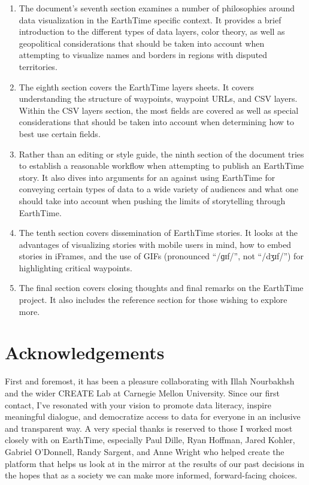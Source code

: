 \documentclass[
]{book}
\begin{document}
\begin{enumerate}
\item
  The document's seventh section examines a number of philosophies around data visualization in the EarthTime specific context. It provides a brief introduction to the different types of data layers, color theory, as well as geopolitical considerations that should be taken into account when attempting to visualize names and borders in regions with disputed territories.
\item
  The eighth section covers the EarthTime layers sheets. It covers understanding the structure of waypoints, waypoint URLs, and CSV layers. Within the CSV layers section, the most fields are covered as well as special considerations that should be taken into account when determining how to best use certain fields.
\item
  Rather than an editing or style guide, the ninth section of the document tries to establish a reasonable workflow when attempting to publish an EarthTime story. It also dives into arguments for an against using EarthTime for conveying certain types of data to a wide variety of audiences and what one should take into account when pushing the limits of storytelling through EarthTime.
\item
  The tenth section covers dissemination of EarthTime stories. It looks at the advantages of visualizing stories with mobile users in mind, how to embed stories in iFrames, and the use of GIFs (pronounced ``/ɡɪf/'', not ``/dʒɪf/'') for highlighting critical waypoints.
\item
  The final section covers closing thoughts and final remarks on the EarthTime project. It also includes the reference section for those wishing to explore more.
\end{enumerate}

\hypertarget{acknowledgements}{%
\section*{Acknowledgements}\label{acknowledgements}}


First and foremost, it has been a pleasure collaborating with Illah Nourbakhsh and the wider CREATE Lab at Carnegie Mellon University. Since our first contact, I've resonated with your vision to promote data literacy, inspire meaningful dialogue, and democratize access to data for everyone in an inclusive and transparent way. A very special thanks is reserved to those I worked most closely with on EarthTime, especially Paul Dille, Ryan Hoffman, Jared Kohler, Gabriel O'Donnell, Randy Sargent, and Anne Wright who helped create the platform that helps us look at in the mirror at the results of our past decisions in the hopes that as a society we can make more informed, forward-facing choices.
\end{document}
